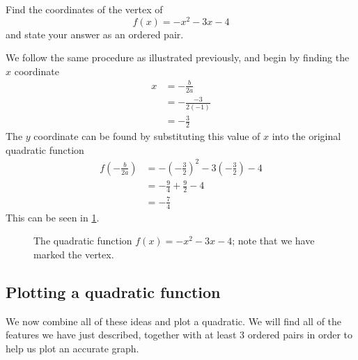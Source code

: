 \begin{myexample}
Find the coordinates of the vertex of
\[
	f(x) = -x^2 - 3x -4
\]
and state your answer as an ordered pair.
\end{myexample}
\begin{myProof}
	We follow the same procedure as illustrated previously, and begin by finding
	the $x$ coordinate
	\begin{align*}
		x & =  -\frac{b}{2a}     \\
		  & =  -\frac{-3}{2(-1)} \\
		  & =  -\frac{3}{2}      
	\end{align*} 
	The $y$ coordinate can be found by substituting this value of $x$ into the original
	quadratic function
	\begin{align*}
		f\left(-\frac{b}{2a}\right) & =  - \left(-\frac{3}{2}\right)^2 - 3\left(- \frac{3}{2}\right)-4 \\
		                            & =  -\frac{9}{4}+\frac{9}{2} - 4                                  \\
		                            & =  - \frac{7}{4}                                                 
	\end{align*} 
	This can be seen in \cref{fig:quadvertex2}.
			
	\begin{figure}[!ht]
		\centering
		\caption{The quadratic function $f(x)=-x^2-3x-4$; note that we have marked the vertex.}
		\label{fig:quadvertex2}
	\end{figure}
	\FloatBarrier
\end{myProof} 

\subsection{Plotting a quadratic function}
We now combine all of these ideas and plot a quadratic. We will find all of the features we have just 
described, together with at least 3 ordered pairs in order to help us plot an accurate graph. 

